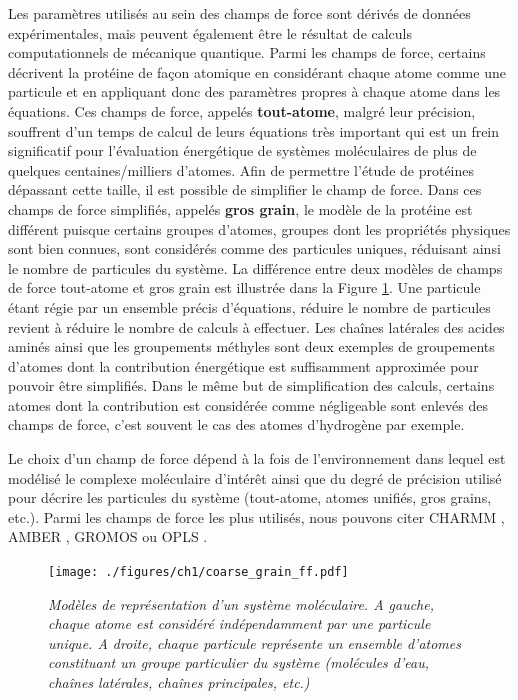 Les paramètres utilisés au sein des champs de force sont dérivés de données expérimentales, mais peuvent également être le résultat de calculs computationnels de mécanique quantique. Parmi les champs de force, certains décrivent la protéine de façon atomique en considérant chaque atome comme une particule et en appliquant donc des paramètres propres à chaque atome dans les équations. Ces champs de force, appelés \textbf{tout-atome}, malgré leur précision, souffrent d'un temps de calcul de leurs équations très important qui est un frein significatif pour l'évaluation énergétique de systèmes moléculaires de plus de quelques centaines/milliers d'atomes. Afin de permettre l'étude de protéines dépassant cette taille, il est possible de simplifier le champ de force. Dans ces champs de force simplifiés, appelés \textbf{gros grain}, le modèle de la protéine est différent puisque certains groupes d'atomes, groupes dont les propriétés physiques sont bien connues, sont considérés comme des particules uniques, réduisant ainsi le nombre de particules du système. La différence entre deux modèles de champs de force tout-atome et gros grain est illustrée dans la Figure \ref{Fig:coarse_grain_ff}. Une particule étant régie par un ensemble précis d'équations, réduire le nombre de particules revient à réduire le nombre de calculs à effectuer. Les chaînes latérales des acides aminés ainsi que les groupements méthyles sont deux exemples de groupements d'atomes dont la contribution énergétique est suffisamment approximée pour pouvoir être simplifiés. Dans le même but de simplification des calculs, certains atomes dont la contribution est considérée comme négligeable sont enlevés des champs de force, c'est souvent le cas des atomes d'hydrogène par exemple.

Le choix d'un champ de force dépend à la fois de l'environnement dans lequel est modélisé le complexe moléculaire d'intérêt ainsi que du degré de précision utilisé pour décrire les particules du système (tout-atome, atomes unifiés, gros grains, etc.). Parmi les champs de force les plus utilisés, nous pouvons citer CHARMM \cite{brooks2009charmm}, AMBER \cite{pearlman1995amber}, GROMOS \cite{oostenbrink2004biomolecular} ou OPLS \cite{jorgensen1996development}.

\begin{figure}
  \centering
  {\texttt{[image: ./figures/ch1/coarse\_grain\_ff.pdf]}}
    \caption{\it Modèles de représentation d'un système moléculaire. A gauche, chaque atome est considéré indépendamment par une particule unique. A droite, chaque particule représente un ensemble d'atomes constituant un groupe particulier du système (molécules d'eau, chaînes latérales, chaînes principales, etc.)}
    \label{Fig:coarse_grain_ff}
  \hspace{0.2cm}
\end{figure}

